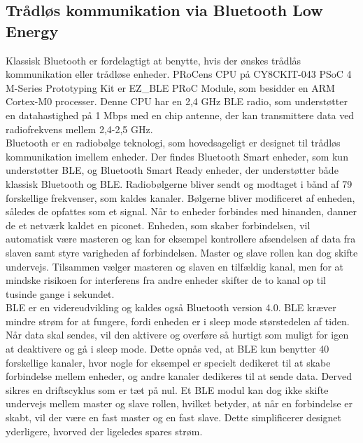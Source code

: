 \subsection{Trådløs kommunikation via Bluetooth Low Energy} 
Klassisk Bluetooth er fordelagtigt at benytte, hvis der ønskes trådlås kommunikation eller trådløse enheder. PRoCens CPU på CY8CKIT-043 PSoC 4 M-Series Prototyping Kit er EZ\_BLE PRoC Module, som besidder en ARM Cortex-M0 processer. %
Denne CPU har en 2,4 GHz BLE radio, som understøtter en datahastighed på 1 Mbps med en chip antenne, der kan transmittere data ved radiofrekvens mellem 2,4-2,5 GHz. %
\citep{Semiconductor2016PRoC,Semiconductor2016BLEdyb}\\
Bluetooth er en radiobølge teknologi, som hovedsageligt er designet til trådløs kommunikation imellem enheder. Der findes Bluetooth Smart enheder, som kun understøtter BLE, og Bluetooth Smart Ready enheder, der understøtter både klassisk Bluetooth og BLE. Radiobølgerne bliver sendt og modtaget i bånd af 79 forskellige frekvenser, som kaldes kanaler. Bølgerne bliver modificeret af enheden, således de opfattes som et signal. Når to enheder forbindes med hinanden, danner de et netværk kaldet en piconet. Enheden, som skaber forbindelsen, vil automatisk være masteren og kan for eksempel kontrollere afsendelsen af data fra slaven samt styre varigheden af forbindelsen. Master og slave rollen kan dog skifte undervejs. Tilsammen vælger masteren og slaven en tilfældig kanal, men for at mindske risikoen for interferens fra andre enheder skifter de to kanal op til tusinde gange i sekundet. \citep{CYPRESS2016workshopBLE,Sauter2011} \\
BLE er en videreudvikling og kaldes også Bluetooth version 4.0. BLE kræver mindre strøm for at fungere, fordi enheden er i sleep mode størstedelen af tiden. Når data skal sendes, vil den aktivere og overføre så hurtigt som muligt for igen at deaktivere og gå i sleep mode. Dette opnås ved, at BLE kun benytter 40 forskellige kanaler, hvor nogle for eksempel er specielt dedikeret til at skabe forbindelse mellem enheder, og andre kanaler dedikeres til at sende data. Derved sikres en driftscyklus som er tæt på nul. Et BLE modul kan dog ikke skifte undervejs mellem master og slave rollen, hvilket betyder, at når en forbindelse er skabt, vil der være en fast master og en fast slave. Dette simplificerer designet yderligere, hvorved der ligeledes spares strøm. \citep{Gupta2013}